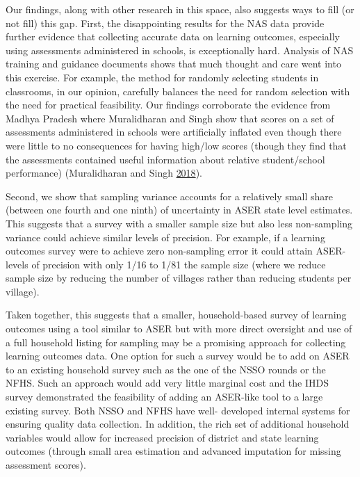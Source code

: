 \documentclass[
  11pt,
]{article}
\begin{document}
Our findings, along with other research in this space, also suggests ways to fill (or not fill) this gap. First, the disappointing results for the NAS data provide further evidence that collecting accurate data on learning outcomes, especially using assessments administered in schools, is exceptionally hard. Analysis of NAS training and guidance documents shows that much thought and care went into this exercise. For example, the method for randomly selecting students in classrooms, in our opinion, carefully balances the need for random selection with the need for practical feasibility. Our findings corroborate the evidence from Madhya Pradesh where Muralidharan and Singh show that scores on a set of assessments administered in schools were artificially inflated even though there were little to no consequences for having high/low scores (though they find that the assessments contained useful information about relative student/school performance) (Muralidharan and Singh \protect\hyperlink{ref-muralidharan2018improving}{2018}).

Second, we show that sampling variance accounts for a relatively small share (between one fourth and one ninth) of uncertainty in ASER state level estimates. This suggests that a survey with a smaller sample size but also less non-sampling variance could achieve similar levels of precision. For example, if a learning outcomes survey were to achieve zero non-sampling error it could attain ASER-levels of precision with only 1/16 to 1/81 the sample size (where we reduce sample size by reducing the number of villages rather than reducing students per village).

Taken together, this suggests that a smaller, household-based survey of learning outcomes using a tool similar to ASER but with more direct oversight and use of a full household listing for sampling may be a promising approach for collecting learning outcomes data. One option for such a survey would be to add on ASER to an existing household survey such as the one of the NSSO rounds or the NFHS. Such an approach would add very little marginal cost and the IHDS survey demonstrated the feasibility of adding an ASER-like tool to a large existing survey. Both NSSO and NFHS have well- developed internal systems for ensuring quality data collection. In addition, the rich set of additional household variables would allow for increased precision of district and state learning outcomes (through small area estimation and advanced imputation for missing assessment scores).
\end{document}

